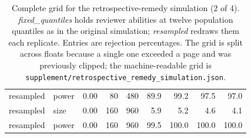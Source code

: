 \begin{table}[p]
\begin{tabular}{@{}llrrrrrrr@{}}
resampled & power & 0.00 & 80 & 480 & 89.9 & 99.2 & 97.5 & 97.0 \\
resampled & size & 0.00 & 160 & 960 & 5.9 & 5.2 & 4.6 & 4.1 \\
resampled & power & 0.00 & 160 & 960 & 99.5 & 100.0 & 100.0 & 100.0 \\
\bottomrule
\end{tabular}
\caption{Complete grid for the retrospective-remedy simulation (2 of 4). \emph{fixed\_quantiles} holds reviewer abilities at twelve population quantiles as in the original simulation; \emph{resampled} redraws them each replicate. Entries are rejection percentages. The grid is split across floats because a single one exceeded a page and was previously clipped; the machine-readable grid is \texttt{supplement/retrospective\_remedy\_simulation.json}.}
\label{tab:retrospective-remedies-full-2}
\end{table}

